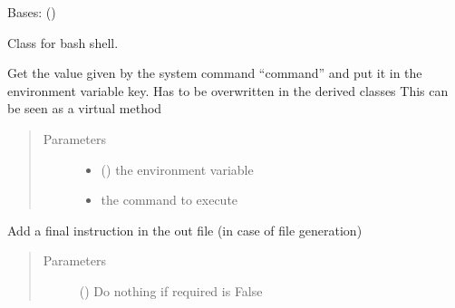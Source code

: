 \documentclass[a4paper,10pt,english]{sphinxmanual}
\begin{document}
\begin{fulllineitems}
\label{\detokenize{commands/apidoc/src:src.fileEnviron.BashFileEnviron}}
Bases: {\hyperref[\detokenize{commands/apidoc/src:src.fileEnviron.FileEnviron}]{}} ()

Class for bash shell.

\begin{fulllineitems}
\label{\detokenize{commands/apidoc/src:src.fileEnviron.BashFileEnviron.command_value}}
Get the value given by the system command “command” 
and put it in the environment variable key.
Has to be overwritten in the derived classes
This can be seen as a virtual method
\begin{quote}\begin{description}
\item[{Parameters}] \leavevmode\begin{itemize}
\item {} 
 () \textendash{} the environment variable

\item {} 
 \textendash{} the command to execute

\end{itemize}

\end{description}\end{quote}

\end{fulllineitems}


\begin{fulllineitems}
\label{\detokenize{commands/apidoc/src:src.fileEnviron.BashFileEnviron.finish}}
Add a final instruction in the out file (in case of file generation)
\begin{quote}\begin{description}
\item[{Parameters}] \leavevmode
{} () \textendash{} Do nothing if required is False


\end{description}
\end{quote}
\end{fulllineitems}
\end{fulllineitems}
\end{document}
